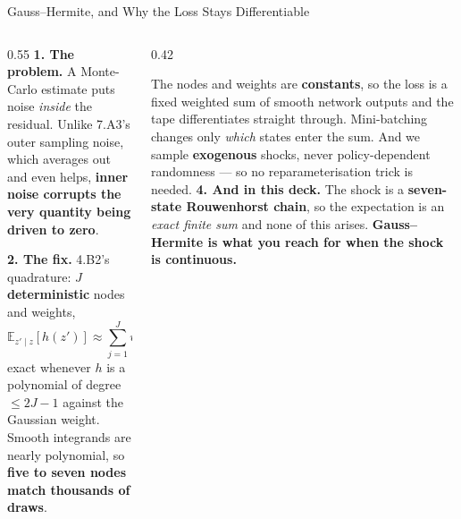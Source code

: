 \begin{frame}{Gauss--Hermite, and Why the Loss Stays Differentiable}
\begin{columns}[T]
\begin{column}{0.55\textwidth}
\small
\textbf{1. The problem.} A Monte-Carlo estimate puts noise \emph{inside} the residual. Unlike 7.A3's outer sampling noise, which averages out and even helps, \textbf{inner noise corrupts the very quantity being driven to zero}.
\smallskip

\textbf{2. The fix.} 4.B2's quadrature: $J$ \textbf{deterministic} nodes and weights,
\[
  \mathbb{E}_{z'\mid z}[h(z')]\approx\sum_{j=1}^{J}w_j\,h(z'_j),
\]
exact whenever $h$ is a polynomial of degree $\le 2J-1$ against the Gaussian weight. Smooth integrands are nearly polynomial, so \textbf{five to seven nodes match thousands of draws}.
\end{column}
\begin{column}{0.42\textwidth}
\begin{takeawaybox}[title=\textbf{3. Why it is safe for \texttt{autograd}}]\footnotesize
The nodes and weights are \textbf{constants}, so the loss is a fixed weighted sum of smooth network outputs and the tape differentiates straight through. Mini-batching changes only \emph{which} states enter the sum. And we sample \textbf{exogenous} shocks, never policy-dependent randomness --- so no reparameterisation trick is needed.
\medskip
\textbf{4. And in this deck.} The shock is a \textbf{seven-state Rouwenhorst chain}, so the expectation is an \emph{exact finite sum} and none of this arises. \textbf{Gauss--Hermite is what you reach for when the shock is continuous.}
\end{takeawaybox}
\end{column}
\end{columns}
\vspace{1mm}
\end{frame}

